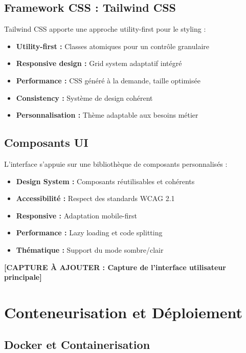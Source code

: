 \subsection{Framework CSS : Tailwind CSS}

Tailwind CSS apporte une approche utility-first pour le styling :

\begin{itemize}
    \item \textbf{Utility-first :} Classes atomiques pour un contrôle granulaire
    \item \textbf{Responsive design :} Grid system adaptatif intégré
    \item \textbf{Performance :} CSS généré à la demande, taille optimisée
    \item \textbf{Consistency :} Système de design cohérent
    \item \textbf{Personnalisation :} Thème adaptable aux besoins métier
\end{itemize}

\subsection{Composants UI}

L'interface s'appuie sur une bibliothèque de composants personnalisés :

\begin{itemize}
    \item \textbf{Design System :} Composants réutilisables et cohérents
    \item \textbf{Accessibilité :} Respect des standards WCAG 2.1
    \item \textbf{Responsive :} Adaptation mobile-first
    \item \textbf{Performance :} Lazy loading et code splitting
    \item \textbf{Thématique :} Support du mode sombre/clair
\end{itemize}

\textbf{[CAPTURE À AJOUTER : Capture de l'interface utilisateur principale]}

\section{Conteneurisation et Déploiement}

\subsection{Docker et Containerisation}

